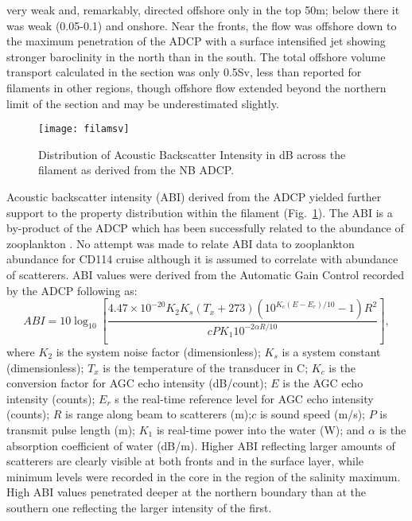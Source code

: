 very weak and, remarkably, directed offshore only in the top 50m;
below there it was weak (0.05-0.1\vel ) and onshore. Near the
fronts, the flow was offshore down to the maximum penetration of
the ADCP with a surface intensified jet showing stronger
baroclinity in the north than in the south.  The total offshore
volume transport calculated in the section was only 0.5Sv, less
than reported for filaments in other regions, though offshore flow
extended beyond the northern limit of the section and may be
underestimated slightly.
\begin{figure}
\centering %
\texttt{[image: filamsv]}%
\caption{Distribution of Acoustic Backscatter Intensity in dB
across the filament as derived from the NB ADCP.}
\label{fig:cd114sv}
\end{figure}

Acoustic backscatter intensity (ABI) derived from the ADCP yielded
further support to the property distribution within the filament
(Fig.~\ref{fig:cd114sv}). The ABI is a by-product of the ADCP
which has been successfully related to the abundance of
zooplankton \citep{Flagg89, Zimmerman99}. No attempt was made to
relate ABI data to zooplankton abundance for CD114 cruise although
it is assumed to correlate with abundance of scatterers. ABI
values were derived from the Automatic Gain Control recorded by
the ADCP following \citet{RDI98} as:
\begin{equation}\label{eq:abi}
  ABI=10\log _{10}\left[\frac{4.47\times10^{-20}K_2 K_s (T_x +273)
  (10^{K_c(E-E_r)/10}-1)R^2}{c P K_1 10^{-2\alpha R/10}}\right],
\end{equation}
where $K_2$ is the system noise factor (dimensionless); $K_s$ is a
system constant (dimensionless); $T_x$ is the temperature of the
transducer in \deg C; $K_c$ is the conversion factor for AGC echo
intensity (dB/count); $E$ is the AGC echo intensity (counts);
$E_r$ s the real-time reference level for AGC echo intensity
(counts); $R$ is range along beam to scatterers (m);$c$ is sound
speed (m/s); $P$ is transmit pulse length (m); $K_1$ is real-time
power into the water (W); and $\alpha$ is the absorption
coefficient of water (dB/m). Higher ABI reflecting larger amounts
of scatterers are clearly visible at both fronts and in the
surface layer, while minimum levels were recorded in the core in
the region of the salinity maximum. High ABI values penetrated
deeper at the northern boundary than at the southern one
reflecting the larger intensity of the first.
